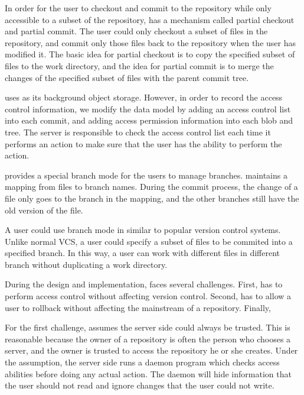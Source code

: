 In order for the user to checkout and commit to the repository while only
accessible to a subset of the repository, \sys has a mechanism called partial
checkout and partial commit. The user could only checkout a subset of files in
the repository, and commit only those files back to the repository when the user
has modified it. The basic idea for partial checkout is to copy the specified
subset of files to the work directory, and the idea for partial commit is to
merge the changes of the specified subset of files with the parent commit tree.

\sys uses \git as its background object storage. However, in order to record the
access control information, we modify the data model by adding an access control
list into each commit, and adding access permission information into each blob
and tree. The server is responsible to check the
access control list each time it performs an action to make sure that the user
has the ability to perform the action.

\sys provides a special branch mode for the users to manage branches. \Sys
maintains a mapping from files to branch names. During the commit process, the
change of a file only goes to the branch in the mapping, and the other branches
still have the old version of the file.

A user could use branch mode in \sys similar to popular version control systems.
Unlike normal VCS, a user could specify a subset of files to be commited into a
specified branch. In this way, a user can work with different files in different
branch without duplicating a work directory. 

During the design and implementation, \sys faces several challenges.
First, \sys has to perform access control without affecting version control.
Second, \sys has to allow a user to rollback without affecting the mainstream
of a repository. Finally, 

For the first challenge, \sys assumes the server side could always be trusted.
This is reasonable because the owner of a repository is often the person who
chooses a server, and the owner is trusted to access the repository he or she creates.
Under the assumption, the server side runs a daemon program which checks access abilities before
doing any actual action.
The daemon will hide information that the user should not
read and ignore changes that the user could not write.

